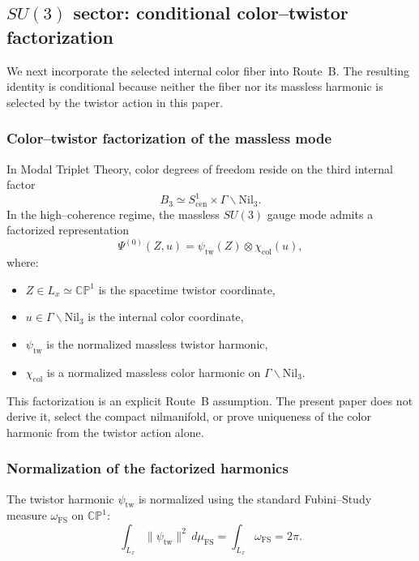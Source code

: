\documentclass[11pt]{article}
\begin{document}
\subsection{$SU(3)$ sector: conditional color--twistor factorization}

We next incorporate the selected internal color fiber into Route~B. The
resulting identity is conditional because neither the fiber nor its massless
harmonic is selected by the twistor action in this paper.

\subsubsection{Color--twistor factorization of the massless mode}

In Modal Triplet Theory, color degrees of freedom reside on the third internal
factor
\[
B_3 \simeq S^1_{\mathrm{cen}} \times \Gamma\backslash\mathrm{Nil}_3.
\]
In the high--coherence regime, the massless $SU(3)$ gauge mode admits a
factorized representation
\begin{equation}
\Psi^{(0)}(Z,u)
=
\psi_{\mathrm{tw}}(Z)\otimes \chi_{\mathrm{col}}(u),
\label{eq:color_twistor_factorization}
\end{equation}
where:
\begin{itemize}
\item $Z\in L_x\simeq\mathbb{CP}^1$ is the spacetime twistor coordinate,
\item $u\in \Gamma\backslash\mathrm{Nil}_3$ is the internal color coordinate,
\item $\psi_{\mathrm{tw}}$ is the normalized massless twistor harmonic,
\item $\chi_{\mathrm{col}}$ is a normalized massless color harmonic on
$\Gamma\backslash\mathrm{Nil}_3$.
\end{itemize}

This factorization is an explicit Route~B assumption. The present paper does
not derive it, select the compact nilmanifold, or prove uniqueness of the color
harmonic from the twistor action alone.

\subsubsection{Normalization of the factorized harmonics}

The twistor harmonic $\psi_{\mathrm{tw}}$ is normalized using the standard
Fubini--Study measure $\omega_{\mathrm{FS}}$ on $\mathbb{CP}^1$:
\begin{equation}
\int_{L_x} \|\psi_{\mathrm{tw}}\|^2\, d\mu_{\mathrm{FS}}
=
\int_{L_x} \omega_{\mathrm{FS}}
=
2\pi.
\label{eq:SU3_twistor_norm}
\end{equation}
\end{document}

